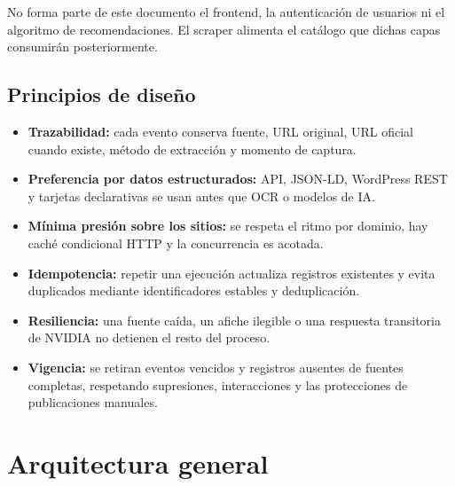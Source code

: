 \documentclass[11pt,a4paper]{article}
\begin{document}
No forma parte de este documento el frontend, la autenticaci\'{o}n de usuarios ni el algoritmo de recomendaciones. El scraper alimenta el cat\'{a}logo que dichas capas consumir\'{a}n posteriormente.

\subsection{Principios de dise\~{n}o}

\begin{itemize}
  \item \textbf{Trazabilidad:} cada evento conserva fuente, URL original, URL oficial cuando existe, m\'{e}todo de extracci\'{o}n y momento de captura.
  \item \textbf{Preferencia por datos estructurados:} API, JSON-LD, WordPress REST y tarjetas declarativas se usan antes que OCR o modelos de IA.
  \item \textbf{M\'{i}nima presi\'{o}n sobre los sitios:} se respeta el ritmo por dominio, hay cach\'{e} condicional HTTP y la concurrencia es acotada.
  \item \textbf{Idempotencia:} repetir una ejecuci\'{o}n actualiza registros existentes y evita duplicados mediante identificadores estables y deduplicaci\'{o}n.
  \item \textbf{Resiliencia:} una fuente ca\'{i}da, un afiche ilegible o una respuesta transitoria de NVIDIA no detienen el resto del proceso.
  \item \textbf{Vigencia:} se retiran eventos vencidos y registros ausentes de fuentes completas, respetando supresiones, interacciones y las protecciones de publicaciones manuales.
\end{itemize}

\section{Arquitectura general}
\end{document}
